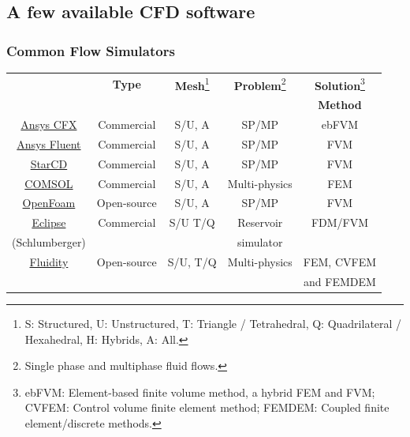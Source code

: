 \documentclass[10pt,compress,handout,ignorenonframetext]{beamer}
\begin{document}
\subsection{A few available CFD software}  
\begin{frame}
 \frametitle{Common Flow Simulators}
\begin{center}
\begin{tabular}{||c|| c | c | c | c ||}
\hline\hline
                   & {\bf Type}  & 
{\bf Mesh}\footnote{S: Structured, U: Unstructured, T: Triangle / Tetrahedral, Q: Quadrilateral / Hexahedral, H: Hybrids, A: All.} & 
{\bf Problem}\footnote{Single phase and multiphase fluid flows.} & 
{\bf Solution}\footnote{ebFVM: Element-based finite volume method, a hybrid FEM and FVM; CVFEM: Control volume finite element method; FEMDEM: Coupled finite element/discrete methods.} \\
                   &             &            &               & {\bf Method}   \\
\hline\hline
\href{http://www.ansys.com/Products/Simulation+Technology/Fluid+Dynamics/Fluid+Dynamics+Products/ANSYS+CFX}
{Ansys CFX}          & Commercial  &  S/U, A    &   SP/MP  & ebFVM \\
\hline
\href{http://www.ansys.com/Products/Simulation+Technology/Fluid+Dynamics/Fluid+Dynamics+Products/ANSYS+Fluent}
{Ansys Fluent}       & Commercial  & S/U, A    &   SP/MP     & FVM           \\
\hline
\href{http://www.cd-adapco.com}
{StarCD}             & Commercial  & S/U, A    &   SP/MP     & FVM  \\ 
\hline
\href{http://www.uk.comsol.com/}
{COMSOL}            & Commercial   & S/U, A    &  Multi-physics & FEM \\
\hline
\href{http://www.openfoam.com/} 
{OpenFoam} & Open-source & S/U, A & SP/MP & FVM \\
\hline
\href{http://www.software.slb.com/products/foundation/pages/eclipse.aspx}
{Eclipse}  & Commercial & S/U T/Q    & Reservoir  &FDM/FVM \\
(Schlumberger)&         &            & simulator  &        \\
\hline
\href{http://www3.imperial.ac.uk/earthscienceandengineering/research/amcg/fluidity}
{Fluidity}             & Open-source & S/U, T/Q   & Multi-physics & FEM, CVFEM \\
                        &            &            &               & and FEMDEM \\

\hline\hline
\end{tabular}
 
\end{center}

\end{frame}
\end{document}

